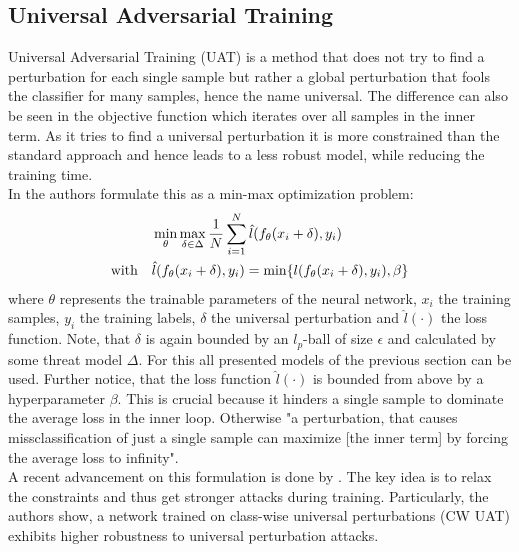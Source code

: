 \documentclass{article}
\begin{document}
\subsection{Universal Adversarial Training}
Universal Adversarial Training (UAT) is a method that does not try to find a perturbation for each single sample but rather a global perturbation that fools the classifier for many samples, hence the name universal. The difference can also be seen in the objective function which iterates over all samples in the inner term. As it tries to find a universal perturbation it is more constrained than the standard approach and hence leads to a less robust model, while reducing the training time. \\
In \cite{b4} the authors formulate this as a min-max optimization problem:
\begingroup
\setlength\abovedisplayskip{0pt}
\setlength\belowdisplayskip{6pt}
\begin{align}
  \label{eqn:universal}
  & \min_{\theta} \max_{\delta \in \Delta} \space \frac{1}{N} \sum_{i=1}^N \space \hat{l}(f_{\theta}(x_i + \delta), y_i) \\
  \text{with} \quad & \hat{l}(f_{\theta}(x_i + \delta), y_i) = \min \{l(f_{\theta}(x_i + \delta), y_i), \beta \}
\end{align}
\endgroup
where $\theta$ represents the trainable parameters of the neural network, $x_i$ the training samples, $y_i$ the training labels, $\delta$ the universal perturbation and $\hat{l}(\cdot)$ the loss function. Note, that $\delta$ is again bounded by an $l_p$-ball of size $\epsilon$ and calculated by some threat model $\Delta$. For this all presented models of the previous section can be used. Further notice, that the loss function $\hat{l}(\cdot)$ is bounded from above by a hyperparameter $\beta$. This is crucial because it hinders a single sample to dominate the average loss in the inner loop. Otherwise "a perturbation, that causes missclassification of just a single sample can maximize [the inner term] by forcing the average loss to infinity"\cite{b4}. \\
A recent advancement on this formulation is done by \cite{b11}. The key idea is to relax the constraints and thus get stronger attacks during training. Particularly, the authors show, a network trained on class-wise universal perturbations (CW UAT) exhibits higher robustness to universal perturbation attacks.
  
\end{document}
